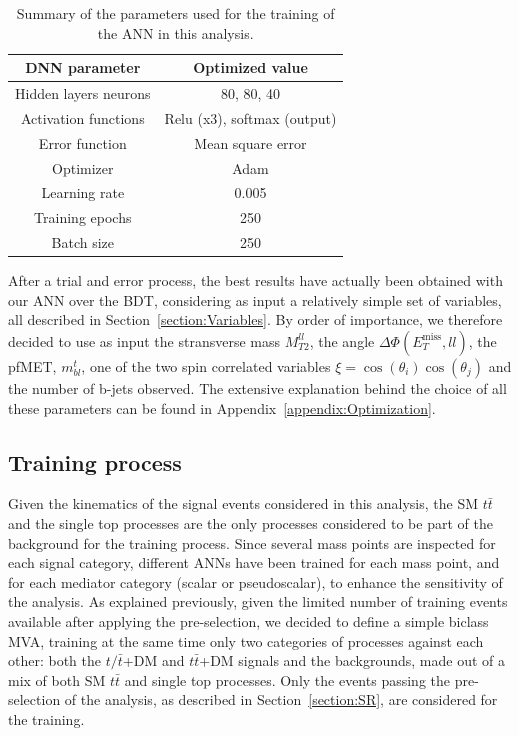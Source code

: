 \documentclass[a4paper, 10pt, openright]{report}
\begin{document}
\begin{table}
\begin{center}
\begin{tabular}{ c|c } 
\hline
 DNN parameter & Optimized value \\
 \hline
 Hidden layers neurons & 80, 80, 40 \\
 Activation functions & Relu (x3), softmax (output) \\
Error function & Mean square error \\
Optimizer & Adam \\
Learning rate & 0.005 \\
Training epochs & 250 \\
Batch size & 250 \\
\hline
\end{tabular}
\caption{Summary of the parameters used for the training of the \ac{ANN} in this analysis.}
\label{table:DNN}
\end{center}
\end{table}

After a trial and error process, the best results have actually been obtained with our \ac{ANN} over the \ac{BDT}, considering as input a relatively simple set of variables, all described in Section~\ref{section:Variables}. By order of importance, we therefore decided to use as input the stransverse mass $M_{T2}^{ll}$, the angle $\Delta \Phi(E_{T}^{\text{miss}}, ll)$, the pf\ac{MET}, $m_{bl}^t$, one of the two spin correlated variables $\xi = \cos(\theta_i) \cos(\theta_j)$ and the number of b-jets observed. The extensive explanation behind the choice of all these parameters can be found in Appendix~\ref{appendix:Optimization}.

\subsection{Training process}


Given the kinematics of the signal events considered in this analysis, the \ac{SM} $t \bar t$ and the single top processes are the only processes considered to be part of the background for the training process. Since several mass points are inspected for each signal category, different \acp{ANN} have been trained for each mass point, and for each mediator category (scalar or pseudoscalar), to enhance the sensitivity of the analysis. As explained previously, given the limited number of training events available after applying the pre-selection, we decided to define a simple biclass \ac{MVA}, training at the same time only two categories of processes against each other: both the $t/\bar t$+DM and $t \bar t$+DM signals and the backgrounds, made out of a mix of both \ac{SM} $t \bar t$ and single top processes. Only the events passing the pre-selection of the analysis, as described in Section~\ref{section:SR}, are considered for the training. 
\end{document}
